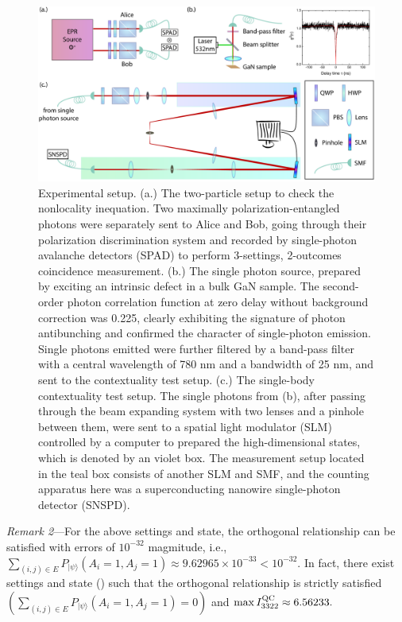 \documentclass[prl,letterpaper,english,reprint,nofootinbib,aps,superscriptaddress,showpacs,showkeys]{revtex4-1}
\theoremstyle{definition}
\theoremstyle{remark}
\begin{document}
\begin{figure}[htbp]
    \centering
    \includegraphics[width = .97\textwidth]{fig/exp-sch-draft-v2.pdf}
    \caption{Experimental setup.
    (a.) The two-particle setup to check the nonlocality inequation. Two maximally polarization-entangled photons were separately sent to Alice and Bob, going through their polarization discrimination system and recorded by single-photon avalanche detectors (SPAD) to perform 3-settings, 2-outcomes coincidence measurement.
    (b.) The single photon source, prepared by exciting an intrinsic defect in a bulk GaN sample. The second-order photon correlation function at zero delay without background correction was 0.225, clearly exhibiting the signature of photon antibunching and confirmed the character of single-photon emission. Single photons emitted were further filtered by a band-pass filter with a central wavelength of 780 nm and a bandwidth of 25 nm, and sent to the contextuality test setup.
    (c.) The single-body contextuality test setup.
    The single photons from (b), after passing through the beam expanding system with two lenses and a pinhole between them, were sent to a spatial light modulator (SLM) controlled by a computer to prepared the high-dimensional states, which is denoted by an violet box. The measurement setup located in the teal box consists of another SLM and SMF, and the counting apparatus here was a superconducting nanowire single-photon detector (SNSPD).}
    \label{fig:exp-sch}
 \end{figure}

\emph{Remark 2}---For the above settings and state, the orthogonal relationship can be satisfied with errors of $10^{-32}$ magmitude, i.e.,
$\sum_{(i,j)\in E}P_{|\psi\rangle}(A_i=1,A_j=1)\approx 9.62965\times 10^{-33}<10^{-32}.$
In fact, there exist settings and state (\cite{SM}) such that the orthogonal relationship is strictly satisfied  $(\sum_{(i,j)\in E}P_{|\psi\rangle}(A_i=1,A_j=1)=0)$ and $\max I_{3322}^{\rm QC}\approx 6.56233.$ 
\end{document}
